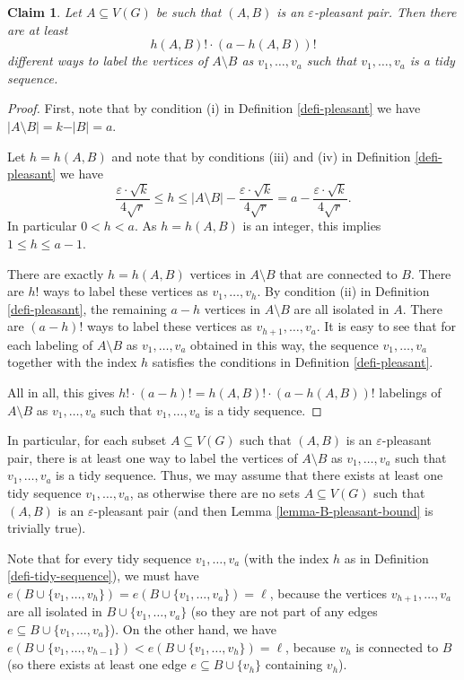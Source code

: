\documentclass[11pt]{article}
\newtheorem{claim}[theorem]{Claim}
\theoremstyle{definition}
\numberwithin{equation}{section}
\begin{document}
\begin{claim}\label{claim-count-labelings-tidy} Let $A\subseteq V(G)$ be such that $(A,B)$ is an $\varepsilon$-pleasant pair. Then there are at least
\[h(A,B)!\cdot (a-h(A,B))!\]
different ways to  label the vertices of $A\setminus B$ as $v_1,\dots,v_a$ such that $v_1,\dots,v_a$ is a tidy sequence.
\end{claim}
\begin{proof}First, note that by condition (i) in Definition \ref{defi-pleasant} we have $\vert A\setminus B\vert=k-\vert B\vert=a$.

Let $h=h(A,B)$ and note that by conditions (iii) and (iv) in Definition \ref{defi-pleasant} we have 
\[\frac{\varepsilon\cdot \sqrt{k}}{4\sqrt{r}}\leq h\leq \vert A\setminus B\vert-\frac{\varepsilon\cdot \sqrt{k}}{4\sqrt{r}}=a-\frac{\varepsilon\cdot \sqrt{k}}{4\sqrt{r}}.\]
In particular $0<h<a$. As $h=h(A,B)$ is an integer, this implies $1\leq h\leq a-1$.

There are exactly $h=h(A,B)$ vertices in $A\setminus B$ that are connected to $B$. There are $h!$ ways to label these vertices as $v_1,\dots,v_h$. By condition (ii) in Definition \ref{defi-pleasant}, the remaining $a-h$ vertices in $A\setminus B$ are all isolated in $A$. There are $(a-h)!$ ways to label these vertices as $v_{h+1},\dots,v_a$. It is easy to see that for each labeling of $A\setminus B$ as $v_1,\dots,v_a$ obtained in this way, the sequence $v_1,\dots,v_a$ together with the index $h$ satisfies the conditions in Definition \ref{defi-pleasant}.

All in all, this gives $h!\cdot (a-h)!=h(A,B)!\cdot (a-h(A,B))!$ labelings of $A\setminus B$ as $v_1,\dots,v_a$ such that $v_1,\dots,v_a$ is a tidy sequence.
\end{proof}

In particular, for each subset $A\subseteq V(G)$ such that $(A,B)$ is an $\varepsilon$-pleasant pair, there is at least one way to  label the vertices of $A\setminus B$ as $v_1,\dots,v_a$ such that $v_1,\dots,v_a$ is a tidy sequence. Thus, we may assume that there exists at least one tidy sequence $v_1,\dots,v_a$, as otherwise there are no sets $A\subseteq V(G)$ such that $(A,B)$ is an $\varepsilon$-pleasant pair (and then Lemma \ref{lemma-B-pleasant-bound} is trivially true).

Note that for every tidy sequence $v_1,\dots,v_a$ (with the index $h$ as in Definition \ref{defi-tidy-sequence}), we must have $e(B\cup \lbrace v_1,\dots,v_{h}\rbrace)=e(B\cup \lbrace v_1,\dots,v_a\rbrace)=\ell$, because the vertices $v_{h+1},\dots,v_a$ are all isolated in $B\cup \lbrace v_1,\dots,v_a\rbrace$ (so they are not part of any edges $e\subseteq B\cup \lbrace v_1,\dots,v_a\rbrace$). On the other hand, we have $e(B\cup \lbrace v_1,\dots,v_{h-1}\rbrace)<e(B\cup \lbrace v_1,\dots,v_{h}\rbrace)=\ell$, because $v_{h}$ is connected to $B$ (so  there exists at least one edge $e\subseteq B\cup \lbrace v_h\rbrace$ containing $v_{h}$).
\end{document}

